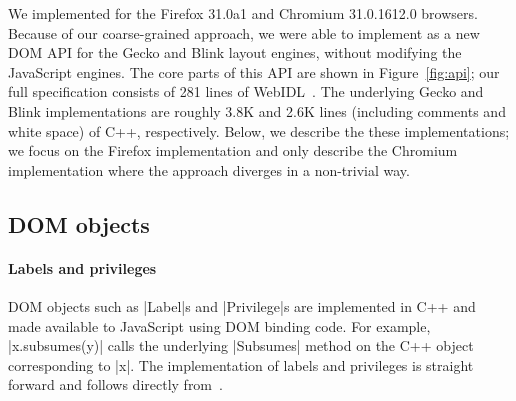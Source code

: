 We implemented \sys{} for the Firefox 31.0a1 and Chromium 31.0.1612.0
browsers.
%
Because of our coarse-grained approach,
we were able to implement \sys{} as a new DOM API for the Gecko and
Blink layout engines, without modifying the JavaScript engines.
%
The core parts of this API are shown in Figure~\ref{fig:api}; our full
specification consists of 281 lines of WebIDL~\cite{webidl}.
%
The underlying Gecko and Blink implementations are roughly 3.8K and
2.6K lines (including comments and white space) of C++, respectively.
%
Below, we describe the these implementations; we focus on the Firefox
implementation and only describe the Chromium implementation where the
approach diverges in a non-trivial way.
%

\subsection{\sys{} DOM objects}


\paragraph{Labels and privileges}
%
DOM objects such as \js|Label|s and \js|Privilege|s are implemented in
C++ and made available to JavaScript using DOM binding code.
%
For example, \js|x.subsumes(y)| calls the underlying \js|Subsumes|
method on the C++ object corresponding to \js|x|.
%
The implementation of labels and privileges is straight forward and
follows directly from~\cite{stefan:2011:dclabels}.


